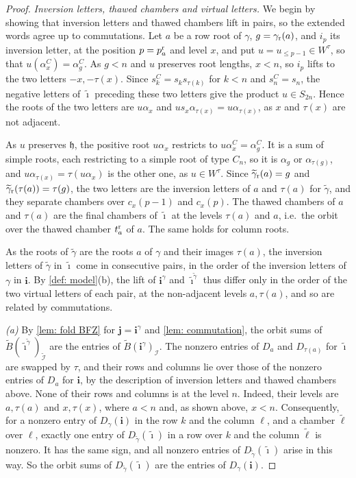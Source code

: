 \documentclass[a4paper]{amsart}
\numberwithin{equation}{section}
\theoremstyle{definition}
\theoremstyle{remark}
\newcommand{\mfh}{\mathfrak{h}}
\newcommand{\mcI}{\mathcal{I}}
\newcommand{\bfi}{\mathbf{i}}
\newcommand{\tbfi}{\widetilde{\boldsymbol{\imath}}}
\newcommand{\bfj}{\mathbf{j}}
\newcommand{\tB}{\widetilde{B}}
\newcommand{\tg}{\widetilde{\gamma}}
\newcommand{\rr}{{\rm r}}
\begin{document}
\begin{proof}
  \emph{Inversion letters, thawed chambers and virtual letters.}
We begin by showing that inversion letters and thawed chambers lift in pairs, so the extended words agree up to commutations.
  Let $a$ be a row root of $\gamma$, $g=\gamma_{\rr}(a)$, and $i_p$ its inversion letter, at the position $p=p^\rr_a$ and level $x$, and put $u=u_{\le p-1}\in W^\tau$, so that $u(\alpha^C_x)=\alpha^C_g$.
  As $g<n$ and $u$ preserves root lengths, $x<n$, so $i_p$ lifts to the two letters $-x,-\tau(x)$.
  Since $s^C_k=s_ks_{\tau(k)}$ for $k<n$ and $s^C_n=s_n$, the negative letters of $\tbfi$ preceding these two letters give the product $u\in S_{2n}$.
  Hence the roots of the two letters are $u\alpha_x$ and $us_x\alpha_{\tau(x)}=u\alpha_{\tau(x)}$, as $x$ and $\tau(x)$ are not adjacent.

  As $u$ preserves $\mfh$, the positive root $u\alpha_x$ restricts to $u\alpha^C_x=\alpha^C_g$.
  It is a sum of simple roots, each restricting to a simple root of type $C_n$, so it is $\alpha_g$ or $\alpha_{\tau(g)}$, and $u\alpha_{\tau(x)}=\tau(u\alpha_x)$ is the other one, as $u\in W^\tau$.
  Since $\tg_{\rr}(a)=g$ and $\tg_{\rr}(\tau(a))=\tau(g)$, the two letters are the inversion letters of $a$ and $\tau(a)$ for $\tg$, and they separate chambers over $c_x(p-1)$ and $c_x(p)$.
  The thawed chambers of $a$ and $\tau(a)$ are the final chambers of $\tbfi$ at the levels $\tau(a)$ and $a$, i.e.\ the orbit over the thawed chamber $t^\rr_a$ of $a$.
  The same holds for column roots.

  As the roots of $\tg$ are the roots $a$ of $\gamma$ and their images $\tau(a)$, the inversion letters of $\tg$ in $\tbfi$ come in consecutive pairs, in the order of the inversion letters of $\gamma$ in $\bfi$.
  By \cref{def: model}(b), the lift of $\bfi^\gamma$ and $\tbfi^{\tg}$ thus differ only in the order of the two virtual letters of each pair, at the non-adjacent levels $a,\tau(a)$, and so are related by commutations.

  \emph{(a)}
  By \cref{lem: fold BFZ} for $\bfj=\bfi^\gamma$ and \cref{lem: commutation}, the orbit sums of $\tB(\tbfi^{\tg})_{\widetilde{\mcI}}$ are the entries of $\tB(\bfi^\gamma)_\mcI$.
  The nonzero entries of $D_a$ and $D_{\tau(a)}$ for $\tbfi$ are swapped by $\tau$, and their rows and columns lie over those of the nonzero entries of $D_a$ for $\bfi$, by the description of inversion letters and thawed chambers above.
  None of their rows and columns is at the level $n$.
  Indeed, their levels are $a,\tau(a)$ and $x,\tau(x)$, where $a<n$ and, as shown above, $x<n$.
  Consequently, for a nonzero entry of $D_\gamma(\bfi)$ in the row $k$ and the column $\ell$, and a chamber $\widetilde{\ell}$ over $\ell$, exactly one entry of $D_{\tg}(\tbfi)$ in a row over $k$ and the column $\widetilde{\ell}$ is nonzero.
  It has the same sign, and all nonzero entries of $D_{\tg}(\tbfi)$ arise in this way.
  So the orbit sums of $D_{\tg}(\tbfi)$ are the entries of $D_\gamma(\bfi)$.


\end{proof}
\end{document}
